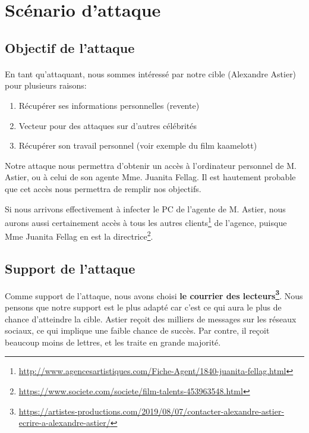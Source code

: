 \section{Scénario d'attaque}

\subsection{Objectif de l'attaque}
\paragraph{} En tant qu'attaquant, nous sommes intéressé par notre cible (Alexandre Astier) pour plusieurs raisons:
\begin{enumerate}
    \item Récupérer ses informations personnelles (revente)
    \item Vecteur pour des attaques sur d'autres célébrités
    \item Récupérer son travail personnel (voir exemple du film kaamelott)
\end{enumerate}

Notre attaque nous permettra d'obtenir un accès à l'ordinateur personnel de M. Astier, ou à celui de son agente Mme. Juanita Fellag.
Il est hautement probable que cet accès nous permettra de remplir nos objectifs.

Si nous arrivons effectivement à infecter le PC de l'agente de M. Astier, 
nous aurons aussi certainement accès à tous les autres clients\footnote{\url{http://www.agencesartistiques.com/Fiche-Agent/1840-juanita-fellag.html}} de l'agence, puisque Mme Juanita Fellag en est la directrice\footnote{\url{https://www.societe.com/societe/film-talents-453963548.html}}.

\subsection{Support de l'attaque}

Comme support de l'attaque, nous avons choisi \textbf{le courrier des lecteurs\footnote{\url{https://artistes-productions.com/2019/08/07/contacter-alexandre-astier-ecrire-a-alexandre-astier/}}}.
Nous pensons que notre support est le plus adapté car c'est ce qui aura le plus de chance d'atteindre la cible.
Astier reçoit des milliers de messages sur les réseaux sociaux, ce qui implique une faible chance de succès.
Par contre, il reçoit beaucoup moins de lettres, et les traite en grande majorité.

